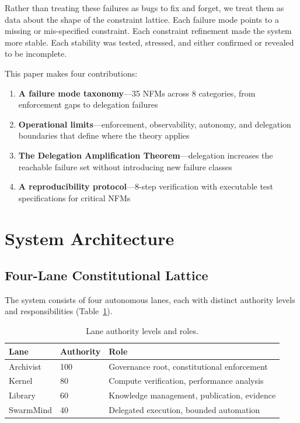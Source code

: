 \documentclass[11pt,letterpaper]{article}
\begin{document}
Rather than treating these failures as bugs to fix and forget, we treat them as data about the shape of the constraint lattice. Each failure mode points to a missing or mis-specified constraint. Each constraint refinement made the system more stable. Each stability was tested, stressed, and either confirmed or revealed to be incomplete.

This paper makes four contributions:

\begin{enumerate}[nosep]
  \item \textbf{A failure mode taxonomy}---35 NFMs across 8 categories, from enforcement gaps to delegation failures
  \item \textbf{Operational limits}---enforcement, observability, autonomy, and delegation boundaries that define where the theory applies
  \item \textbf{The Delegation Amplification Theorem}---delegation increases the reachable failure set without introducing new failure classes
  \item \textbf{A reproducibility protocol}---8-step verification with executable test specifications for critical NFMs
\end{enumerate}

\section{System Architecture}

\subsection{Four-Lane Constitutional Lattice}

The system consists of four autonomous lanes, each with distinct authority levels and responsibilities (Table~\ref{tab:lanes}).

\begin{table}[h]
\centering
\caption{Lane authority levels and roles.}
\label{tab:lanes}
\begin{tabular}{lll}
\toprule
\textbf{Lane} & \textbf{Authority} & \textbf{Role} \\
\midrule
Archivist & 100 & Governance root, constitutional enforcement \\
Kernel & 80 & Compute verification, performance analysis \\
Library & 60 & Knowledge management, publication, evidence \\
SwarmMind & 40 & Delegated execution, bounded automation \\
\bottomrule
\end{tabular}
\end{table}
\end{document}
